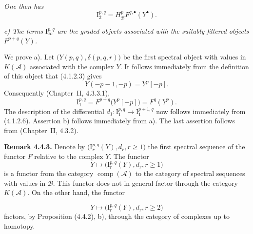 \clearpage
{}%
\begingroup\small\setlength{\parskip}{0pt}\setlength{\emergencystretch}{1.5em}
\setlength{\abovedisplayskip}{4pt plus 2pt minus 2pt}%
\setlength{\belowdisplayskip}{4pt plus 2pt minus 2pt}%

\noindent\textit{One then has}
\[
\mathrm I_2^{p,q}=H_{\mathcal B}^pF^{q,\bullet}(Y^\bullet).
\]

\noindent\textit{c) The terms $\mathrm I_\infty^{p,q}$ are the graded
objects associated with the suitably filtered objects $F^{p+q}(Y)$.}

We prove a). Let $\bigl(Y(p,q),\delta(p,q,r)\bigr)$ be the first spectral
object with values in $K(\mathcal A)$ associated with the complex $Y$. It
follows immediately from the definition of this object that (4.1.2.3)
gives
\[
Y(-p-1,-p)=Y^p[-p].
\]
Consequently (Chapter~II, 4.3.3.1),
\[
\mathrm I_1^{p,q}=F^{p+q}\bigl(Y^p[-p]\bigr)=F^q(Y^p).
\]
The description of the differential
$d_1\colon\mathrm I_1^{p,q}\longrightarrow\mathrm I_1^{p+1,q}$ now
follows immediately from (4.1.2.6). Assertion b) follows immediately from
a). The last assertion follows from (Chapter~II, 4.3.2).

\medskip\noindent\textbf{Remark 4.4.3.}\quad
Denote by $\bigl(\mathrm I_r^{p,q}(Y),d_r,r\geq1\bigr)$ the first spectral
sequence of the functor $F$ relative to the complex $Y$. The functor
\[
Y\longmapsto\bigl(\mathrm I_r^{p,q}(Y),d_r,r\geq1\bigr)
\]
is a functor from the category $\operatorname{comp}(\mathcal A)$ to the
category of spectral sequences with values in $\mathcal B$. This functor
does not in general factor through the category $K(\mathcal A)$. On the
other hand, the functor

\[
Y\longmapsto\bigl(\mathrm I_r^{p,q}(Y),d_r,r\geq2\bigr)
\]
factors, by Proposition (4.4.2), b), through the category of complexes up
to homotopy.

